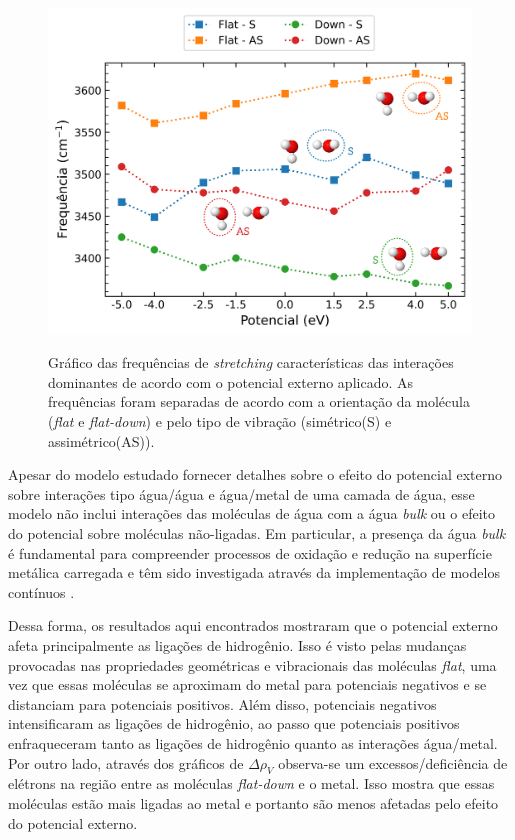 \begin{figure}[b!]
	\centering
	\caption{Gráfico das frequências de \textit{stretching} características das interações dominantes de acordo com o potencial externo aplicado. As frequências foram separadas de acordo com a orientação da molécula (\textit{flat} e \textit{flat-down}) e pelo tipo de vibração (simétrico(S) e assimétrico(AS)). }
	\includegraphics[scale=0.085]{figs/layer_picos.png}
	\label{fig:neq_picos}
\end{figure}
Apesar do modelo estudado fornecer detalhes sobre  o efeito do potencial externo sobre interações tipo água/água e água/metal de uma camada de água, esse modelo não inclui interações das moléculas de água com a água \textit{bulk} ou o efeito do potencial sobre moléculas não-ligadas. Em particular, a presença da água \textit{bulk} é fundamental para compreender processos de oxidação e redução na superfície metálica carregada e têm sido investigada através da implementação de modelos contínuos \cite{bias_agua1,review_new}.  

Dessa forma, os resultados aqui encontrados mostraram que o potencial externo afeta principalmente as ligações de hidrogênio. Isso é visto pelas mudanças provocadas nas propriedades geométricas e vibracionais das moléculas \textit{flat}, uma vez que essas moléculas se aproximam do metal para potenciais negativos e se distanciam para potenciais positivos. Além disso, potenciais negativos intensificaram as ligações de hidrogênio, ao passo que potenciais positivos enfraqueceram tanto as ligações de hidrogênio quanto as interações água/metal. Por outro lado, através dos gráficos de $ \Delta\rho_{V} $ observa-se um excessos/deficiência de elétrons na região entre as moléculas \textit{flat-down} e o metal. Isso mostra que essas moléculas estão mais ligadas ao metal e portanto são menos afetadas pelo efeito do potencial externo.

